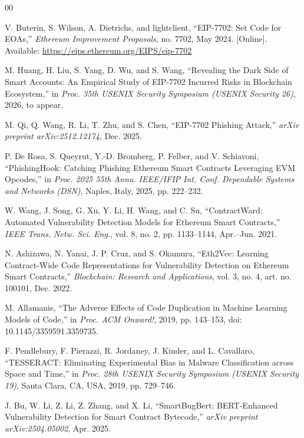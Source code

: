 \documentclass[conference]{IEEEtran}
\begin{document}
\begin{thebibliography}{00}

V. Buterin, S. Wilson, A. Dietrichs, and lightclient, ``EIP-7702: Set Code for EOAs,'' \emph{Ethereum Improvement Proposals}, no. 7702, May 2024. [Online]. Available: \url{https://eips.ethereum.org/EIPS/eip-7702}

M. Huang, H. Liu, S. Yang, D. Wu, and S. Wang, ``Revealing the Dark Side of Smart Accounts: An Empirical Study of EIP-7702 Incurred Risks in Blockchain Ecosystem,'' in \emph{Proc. 35th USENIX Security Symposium (USENIX Security 26)}, 2026, to appear.

M. Qi, Q. Wang, R. Li, T. Zhu, and S. Chen, ``EIP-7702 Phishing Attack,'' \emph{arXiv preprint arXiv:2512.12174}, Dec. 2025.

P. De Rosa, S. Queyrut, Y.-D. Bromberg, P. Felber, and V. Schiavoni, ``PhishingHook: Catching Phishing Ethereum Smart Contracts Leveraging EVM Opcodes,'' in \emph{Proc. 2025 55th Annu. IEEE/IFIP Int. Conf. Dependable Systems and Networks (DSN)}, Naples, Italy, 2025, pp. 222--232.

W. Wang, J. Song, G. Xu, Y. Li, H. Wang, and C. Su, ``ContractWard: Automated Vulnerability Detection Models for Ethereum Smart Contracts,'' \emph{IEEE Trans. Netw. Sci. Eng.}, vol. 8, no. 2, pp. 1133--1144, Apr.--Jun. 2021.

N. Ashizawa, N. Yanai, J. P. Cruz, and S. Okamura, ``Eth2Vec: Learning Contract-Wide Code Representations for Vulnerability Detection on Ethereum Smart Contracts,'' \emph{Blockchain: Research and Applications}, vol. 3, no. 4, art. no. 100101, Dec. 2022.

M. Allamanis, ``The Adverse Effects of Code Duplication in Machine Learning Models of Code,'' in \emph{Proc. ACM Onward!}, 2019, pp. 143--153, doi: 10.1145/3359591.3359735.

F. Pendlebury, F. Pierazzi, R. Jordaney, J. Kinder, and L. Cavallaro, ``TESSERACT: Eliminating Experimental Bias in Malware Classification across Space and Time,'' in \emph{Proc. 28th USENIX Security Symposium (USENIX Security 19)}, Santa Clara, CA, USA, 2019, pp. 729--746.

J. Bu, W. Li, Z. Li, Z. Zhang, and X. Li, ``SmartBugBert: BERT-Enhanced Vulnerability Detection for Smart Contract Bytecode,'' \emph{arXiv preprint arXiv:2504.05002}, Apr. 2025.


\end{thebibliography}
\end{document}
